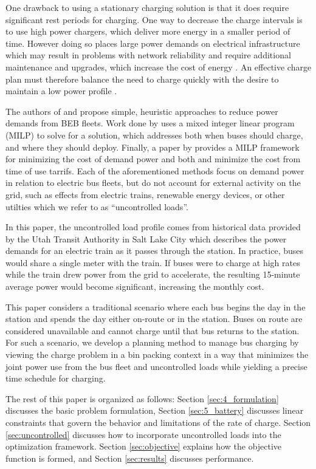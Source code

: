 \par One drawback to using a stationary charging solution is that it does require significant rest periods for charging. One way to decrease the charge intervals is to use high power chargers, which deliver more energy in a smaller period of time. However doing so places large power demands on electrical infrastructure \cite{stahleder_impact_2019} which may result in problems with network reliability \cite{deb_impact_2017} and require additional maintenance and upgrades, which increase the cost of energy \cite{boonraksa_impact_2019}. An effective charge plan must therefore balance the need to charge quickly with the desire to maintain a low power profile \cite{ojer_development_2020}.
\par The authors of \cite{qin_numerical_2016} and \cite{Wang2019} propose simple, heuristic approaches to reduce power demands from BEB fleets. Work done by \cite{bagherinezhad_spatio-temporal_2020} uses a mixed integer linear program (MILP) to solve for a solution, which addresses both when buses should charge, and where they should deploy. Finally, a paper by \cite{He_2019_Fast} provides a MILP framework for minimizing the cost of demand power and both \cite{He_2022_Battery} and \cite{Liu_2022_Optimal} minimize the cost from time of use tarrifs. Each of the aforementioned methods focus on demand power in relation to electric bus fleets, but do not account for external activity on the grid, such as effects from electric trains, renewable energy devices, or other utilties which we refer to as ``uncontrolled loads''.  
\par In this paper, the uncontrolled load profile comes from historical data provided by the Utah Transit Authority in Salt Lake City which describes the power demands for an electric train as it passes through the station. In practice, buses would share a single meter with the train. If buses were to charge at high rates while the train drew power from the grid to accelerate, the resulting 15-minute average power would become significant, increasing the monthly cost. 
\par This paper considers a traditional scenario where each bus begins the day in the station and spends the day either on-route or in the station. Buses on route are considered unavailable and cannot charge until that bus returns to the station. For such a scenario, we develop a planning method to manage bus charging by viewing the charge problem in a bin packing context \cite{Ma_Mixed-integer_2017} in a way that minimizes the joint power use from the bus fleet and uncontrolled loads while yielding a precise time schedule for charging.
\par The rest of this paper is organized as follows: Section \ref{sec:4_formulation} discusses the basic problem formulation, Section \ref{sec:5_battery} discusses linear constraints that govern the behavior and limitations of the rate of charge. Section \ref{sec:uncontrolled} discusses how to incorporate uncontrolled loads into the optimization framework. Section \ref{sec:objective} explains how the objective function is formed, and Section \ref{sec:results} discusses performance.
